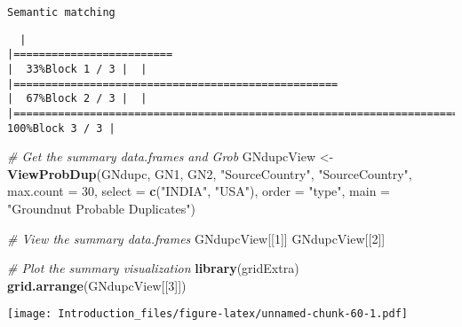 \documentclass[
]{article}
\newenvironment{Shaded}{\begin{snugshade}}{\end{snugshade}}
\newcommand{\CommentTok}[1]{\textcolor[rgb]{0.56,0.35,0.01}{\textit{#1}}}
\newcommand{\DataTypeTok}[1]{\textcolor[rgb]{0.13,0.29,0.53}{#1}}
\newcommand{\DecValTok}[1]{\textcolor[rgb]{0.00,0.00,0.81}{#1}}
\newcommand{\KeywordTok}[1]{\textcolor[rgb]{0.13,0.29,0.53}{\textbf{#1}}}
\newcommand{\NormalTok}[1]{#1}
\newcommand{\StringTok}[1]{\textcolor[rgb]{0.31,0.60,0.02}{#1}}
\begin{document}
\begin{verbatim}
Semantic matching
\end{verbatim}

\begin{verbatim}
  |                                                                                    |=========================                                                   |  33%Block 1 / 3 |  |                                                                                    |===================================================                         |  67%Block 2 / 3 |  |                                                                                    |============================================================================| 100%Block 3 / 3 |
\end{verbatim}

\begin{Shaded}
\begin{Highlighting}[]
\CommentTok{# Get the summary data.frames and Grob}
\NormalTok{GNdupcView <-}\StringTok{ }\KeywordTok{ViewProbDup}\NormalTok{(GNdupc, GN1, GN2, }\StringTok{"SourceCountry"}\NormalTok{, }\StringTok{"SourceCountry"}\NormalTok{,}
                         \DataTypeTok{max.count =} \DecValTok{30}\NormalTok{, }\DataTypeTok{select =} \KeywordTok{c}\NormalTok{(}\StringTok{"INDIA"}\NormalTok{, }\StringTok{"USA"}\NormalTok{), }\DataTypeTok{order =} \StringTok{"type"}\NormalTok{,}
                         \DataTypeTok{main =} \StringTok{"Groundnut Probable Duplicates"}\NormalTok{)}
\end{Highlighting}
\end{Shaded}

\begin{Shaded}
\begin{Highlighting}[]
\CommentTok{# View the summary data.frames}
\NormalTok{GNdupcView[[}\DecValTok{1}\NormalTok{]]}
\NormalTok{GNdupcView[[}\DecValTok{2}\NormalTok{]]}
\end{Highlighting}
\end{Shaded}

\begin{Shaded}
\begin{Highlighting}[]
\CommentTok{# Plot the summary visualization}
\KeywordTok{library}\NormalTok{(gridExtra)}
\KeywordTok{grid.arrange}\NormalTok{(GNdupcView[[}\DecValTok{3}\NormalTok{]])}
\end{Highlighting}
\end{Shaded}

\texttt{[image: Introduction\_files/figure-latex/unnamed-chunk-60-1.pdf]}
\end{document}
